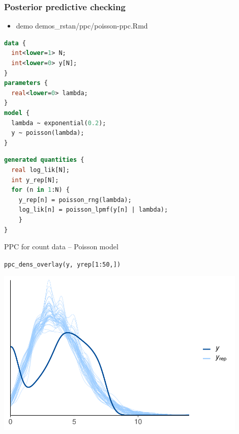 \documentclass[t]{beamer}
\begin{document}
\begin{frame}[fragile]
  \frametitle{Posterior predictive checking}

  \vspace{-0.2\parskip}
  \begin{itemize}
  \item demo demos\_rstan/ppc/poisson-ppc.Rmd
  \end{itemize}

  \vspace{-0.2\parskip}
  {\color{gray}\footnotesize
\begin{lstlisting}[language=Stan]
data {
  int<lower=1> N;
  int<lower=0> y[N];
}
parameters {
  real<lower=0> lambda;
}
model {
  lambda ~ exponential(0.2);
  y ~ poisson(lambda);
}
\end{lstlisting}
  }
  \vspace{-\parskip}
  {\footnotesize
\begin{lstlisting}[language=Stan]
generated quantities {
  real log_lik[N];
  int y_rep[N];
  for (n in 1:N) {
    y_rep[n] = poisson_rng(lambda);
    log_lik[n] = poisson_lpmf(y[n] | lambda);
    }
}
\end{lstlisting}
 }
\end{frame}

\begin{frame}{PPC for count data -- Poisson model}
  
  \vspace{-1\baselineskip}
  \texttt{ppc\_dens\_overlay(y, yrep[1:50,])}

    \includegraphics[height=8cm]{poisson_ppc_dens_overlay.pdf}

\end{frame}
\end{document}
